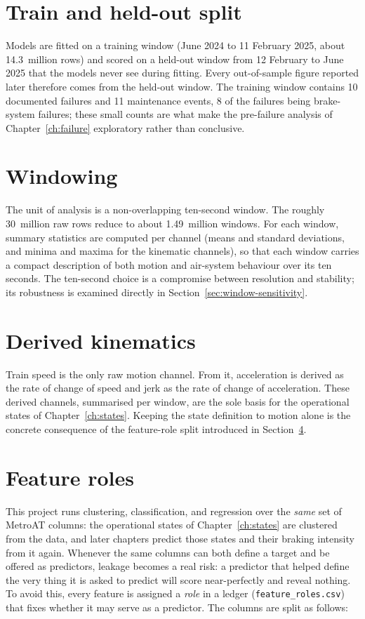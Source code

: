 \section{Train and held-out split}
\label{sec:split}

Models are fitted on a training window (June 2024 to 11 February 2025, about 14.3~million
rows) and scored on a held-out window from 12 February to June 2025 that the models never
see during fitting. Every out-of-sample figure reported later therefore comes from the
held-out window. The training window contains 10 documented failures and 11 maintenance
events, 8 of the failures being brake-system failures; these small counts are what make the
pre-failure analysis of Chapter~\ref{ch:failure} exploratory rather than conclusive.

\section{Windowing}
\label{sec:windowing}

The unit of analysis is a non-overlapping ten-second window. The roughly 30~million raw
rows reduce to about 1.49~million windows. For each window, summary statistics are computed
per channel (means and standard deviations, and minima and maxima for the kinematic
channels), so that each window carries a compact description of both motion and
air-system behaviour over its ten seconds. The ten-second choice is a compromise between
resolution and stability; its robustness is examined directly in
Section~\ref{sec:window-sensitivity}.

\section{Derived kinematics}

Train speed is the only raw motion channel. From it, acceleration is derived as the rate
of change of speed and jerk as the rate of change of acceleration. These derived channels,
summarised per window, are the sole basis for the operational states of
Chapter~\ref{ch:states}. Keeping the state definition to motion alone is the concrete
consequence of the feature-role split introduced in Section~\ref{sec:roles}.

\section{Feature roles}
\label{sec:roles}

This project runs clustering, classification, and regression over the \emph{same} set of
MetroAT columns: the operational states of Chapter~\ref{ch:states} are clustered from the
data, and later chapters predict those states and their braking intensity from it again.
Whenever the same columns can both define a target and be offered as predictors, leakage
becomes a real risk: a predictor that helped define the very thing it is asked to predict
will score near-perfectly and reveal nothing. To avoid this, every feature is assigned a
\emph{role} in a ledger (\texttt{feature\_roles.csv}) that fixes whether it may serve as a
predictor. The columns are split as follows:

